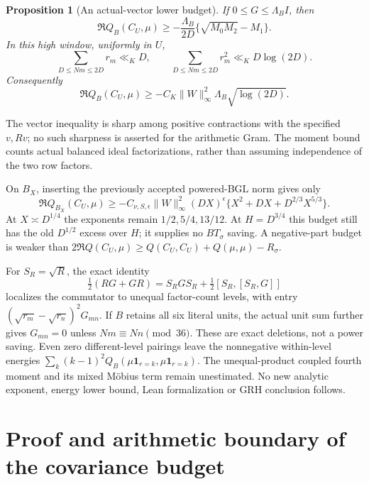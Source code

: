 \documentclass[11pt,oneside,openany]{book}
\newtheorem{proposition}[theorem]{Proposition}
\theoremstyle{definition}\newtheorem{definition}[theorem]{Definition}
\theoremstyle{remark}\newtheorem{remark}[theorem]{Remark}
\begin{document}
\begin{proposition}[An actual-vector lower budget]\label{cbq:budget}
If $0\le G\le\Lambda_B I$, then
\begin{equation}\label{cbq:vector}
 \Re Q_B(C_U,\mu)\ge
 -\frac{\Lambda_B}{2D}\{\sqrt{M_0M_2}-M_1\}.
\end{equation}
In this high window, uniformly in $U$,
\begin{equation}\label{cbq:moments}
 \sum_{D\le Nm\le2D}r_m\ll_K D,\qquad
 \sum_{D\le Nm\le2D}r_m^2\ll_K D\log(2D).
\end{equation}
Consequently
\[
 \Re Q_B(C_U,\mu)\ge
 -C_K\|W\|_\infty^2\Lambda_B\sqrt{\log(2D)}.
\]
\end{proposition}
The vector inequality is sharp among positive contractions with the
specified $v,Rv$; no such sharpness is asserted for the arithmetic Gram.
The moment bound counts actual balanced ideal factorizations, rather than
assuming independence of the two row factors.

On $B_X$, inserting the previously accepted powered-BGL norm gives only
\[
 \Re Q_{B_X}(C_U,\mu)\ge
 -C_{\nu,S,\epsilon}\|W\|_\infty^2(DX)^\epsilon
 \{X^2+DX+D^{2/3}X^{5/3}\}.
\]
At $X\asymp D^{1/4}$ the exponents remain $1/2,5/4,13/12$.
At $H=D^{3/4}$ this budget still has the old $D^{1/2}$ excess over $H$;
it supplies no $BT_\sigma$ saving. A negative-part budget is weaker than
$2\Re Q(C_U,\mu)\ge Q(C_U,C_U)+Q(\mu,\mu)-R_\sigma$.

For $S_R=\sqrt R$, the exact identity
\[
 \tfrac12(RG+GR)=S_RGS_R+\tfrac12[S_R,[S_R,G]]
\]
localizes the commutator to unequal factor-count levels, with entry
$(\sqrt{r_m}-\sqrt{r_n})^2G_{mn}$. If $B$ retains all six literal units,
the actual unit sum further gives $G_{mn}=0$ unless $Nm\equiv Nn\pmod{36}$.
These are exact deletions, not a power saving. Even zero different-level
pairings leave the nonnegative within-level energies
$\sum_k(k-1)^2Q_B(\mu\mathbf1_{r=k},\mu\mathbf1_{r=k})$.
The unequal-product coupled fourth moment and its mixed M\"obius term
remain unestimated. No new analytic exponent, energy lower bound,
Lean formalization or GRH conclusion follows.

\section{Proof and arithmetic boundary of the covariance budget}\label{cbq:details}
\end{document}
